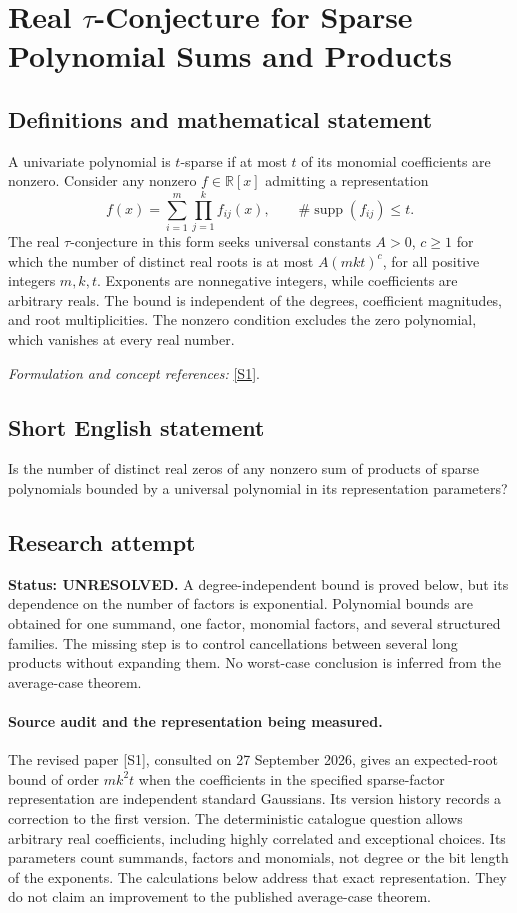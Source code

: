 \documentclass[11pt]{article}
\begin{document}
\section*{\texorpdfstring{Real $\tau$-Conjecture for Sparse Polynomial Sums and Products}{Real \$\textbackslash{}tau\$-Conjecture for Sparse Polynomial Sums and Products}}\label{statement}
\subsection{Definitions and mathematical statement}
A univariate polynomial is $t$-sparse if at most $t$ of its monomial coefficients are nonzero. Consider any nonzero $f\in{\mathbb{R}}[x]$ admitting a representation
\[
 f(x)=\sum_{i=1}^{m}\prod_{j=1}^{k}f_{ij}(x),
 \qquad \#\operatorname{supp}(f_{ij})\le t.
\]
The real $\tau$-conjecture in this form seeks universal constants $A>0$, $c\ge1$ for which the number of distinct real roots is at most $A(mkt)^c$, for all positive integers $m,k,t$. Exponents are nonnegative integers, while coefficients are arbitrary reals. The bound is independent of the degrees, coefficient magnitudes, and root multiplicities. The nonzero condition excludes the zero polynomial, which vanishes at every real number.
\par\smallskip\textit{Formulation and concept references:} \href{https://arxiv.org/pdf/1806.00417}{[S1]}.

\subsection{Short English statement}
Is the number of distinct real zeros of any nonzero sum of products of sparse polynomials bounded by a universal polynomial in its representation parameters?
\subsection{Research attempt}
\textbf{Status: UNRESOLVED.} A degree-independent bound is proved below, but its dependence on the number of factors is exponential. Polynomial bounds are obtained for one summand, one factor, monomial factors, and several structured families. The missing step is to control cancellations between several long products without expanding them. No worst-case conclusion is inferred from the average-case theorem.

\paragraph{Source audit and the representation being measured.}
The revised paper [S1], consulted on 27 September 2026, gives an expected-root bound of order $mk^2t$ when the coefficients in the specified sparse-factor representation are independent standard Gaussians. Its version history records a correction to the first version. The deterministic catalogue question allows arbitrary real coefficients, including highly correlated and exceptional choices. Its parameters count summands, factors and monomials, not degree or the bit length of the exponents. The calculations below address that exact representation. They do not claim an improvement to the published average-case theorem.
\end{document}
